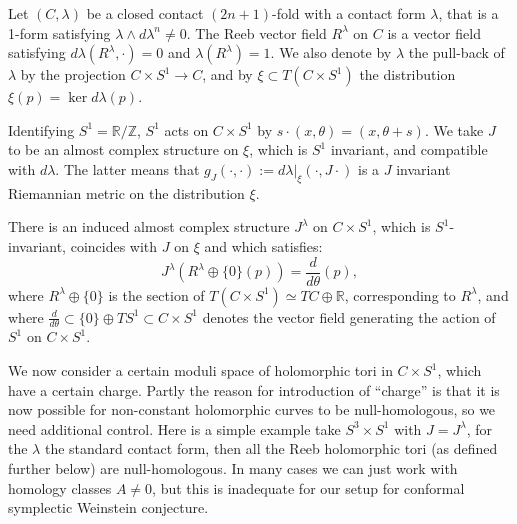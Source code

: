 \documentclass{amsart}
\numberwithin{equation}{section}
\theoremstyle{definition}
\theoremstyle{remark}
\begin{document}
Let $(C, \lambda)$ be a closed contact $(2n+1)$-fold with a contact form
 $\lambda$, that is a 1-form satisfying $\lambda \wedge d\lambda ^{n} \neq 0 $. 
The Reeb vector field $R ^{\lambda} $ on $C$ is a vector field satisfying $d\lambda (R ^{\lambda}, \cdot ) = 0$ and $\lambda (R ^{\lambda}) = 1$.
We also denote by $\lambda$ the pull-back of $\lambda$ by the projection $C \times S ^{1} \to C $, and by $\xi \subset T (C \times S ^{1} )$ the distribution $\xi (p) = \ker d\lambda (p) $. 


Identifying $S ^{1} = \mathbb{R}/\mathbb{Z} $, $S ^{1} $ acts on $C \times S ^{1} $ 
by $s \cdot (x,\theta) = (x, \theta + s)$.
We take $J$ to be an almost complex structure on $\xi$, which is $S ^{1} $ invariant, and compatible with $d\lambda$.  The latter means that $g _{J} (\cdot, \cdot):= d \lambda| _{\xi} (\cdot, J \cdot)$ is a $J$ invariant Riemannian metric on the distribution $\xi$. 

There is an induced almost complex structure $J ^{\lambda}  $ on $C \times S ^{1} $, which is
$S ^{1} $-invariant,  coincides with
$J$ on $\xi$ and which satisfies: 
\begin{equation*}
J ^{\lambda} (R ^{\lambda} \oplus \{0\} (p)) = \frac{d}{d
\theta}(p),
\end{equation*}
where $R ^{\lambda} \oplus \{0\}$ is the section of $T (C \times S ^{1} ) \simeq TC \oplus \mathbb{R}$, corresponding to $R ^{\lambda} $, and where $\frac{d}{d
\theta} \subset \{0\} \oplus TS ^{1}  \subset C \times S ^{1} $ denotes the vector field generating the action of $S ^{1} $ on $C \times S ^{1}  $.


We now consider a certain moduli space of holomorphic tori in $C \times S ^{1} $, which have a certain charge. Partly the reason for introduction of ``charge'' is that it is now possible for non-constant holomorphic curves to be null-homologous, so we need additional control. Here is a simple example take $S ^{3} \times S ^{1}  $ with $J=J ^{\lambda} $, for the $\lambda$ the standard contact form, then all the Reeb holomorphic tori (as defined further below) are null-homologous. In many cases we can just work with homology classes $A \neq 0$,  but this is inadequate for our setup for conformal symplectic Weinstein conjecture.
\end{document}
